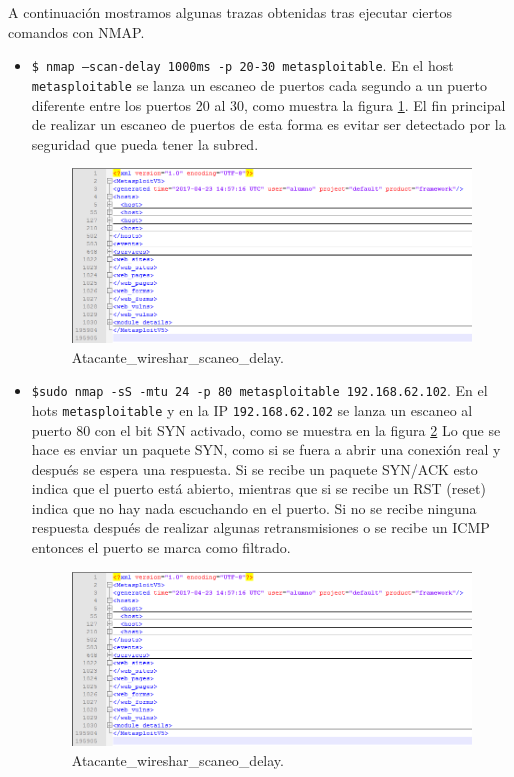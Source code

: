 \documentclass[a4,12pt,onecolum]{article}
\begin{document}
A continuación mostramos algunas trazas obtenidas tras ejecutar ciertos comandos con NMAP.

\begin{itemize}
  \item \texttt{\$ nmap —scan-delay 1000ms -p 20-30 metasploitable}. En el host \texttt{metasploitable} se lanza un escaneo de puertos cada segundo a un puerto diferente entre los puertos 20 al 30, como muestra la figura \ref{fig:nmap5}. El fin principal de realizar un escaneo de puertos de esta forma es evitar ser detectado por la seguridad que pueda tener la subred.

  \begin{figure}[htbp]
  \centering
  \includegraphics[width=1.0\textwidth]{./images/Atacante_scaner_y_BBDD.png}
  \caption{Atacante\_wireshar\_scaneo\_delay.}
  \label{fig:nmap5}
  \end{figure}

  \item \texttt{\$sudo nmap -sS -mtu 24 -p 80 metasploitable 192.168.62.102}. En el hots \texttt{metasploitable} y en la IP \texttt{192.168.62.102} se lanza un escaneo al puerto 80 con el bit SYN activado, como se muestra en la figura \ref{fig:nmap6} Lo que se hace es enviar un paquete SYN, como si se fuera a abrir una conexión real y después se espera una respuesta. Si se recibe un paquete SYN/ACK esto indica que el puerto está abierto, mientras que si se recibe un RST (reset) indica que no hay nada escuchando en el puerto. Si no se recibe ninguna respuesta después de realizar algunas retransmisiones o se recibe un ICMP entonces el puerto se marca como filtrado.

  \begin{figure}[htbp]
  \centering
  \includegraphics[width=1.0\textwidth]{./images/Atacante_scaner_y_BBDD.png}
  \caption{Atacante\_wireshar\_scaneo\_delay.}
  \label{fig:nmap6}
  \end{figure}
\end{itemize}
\end{document}

